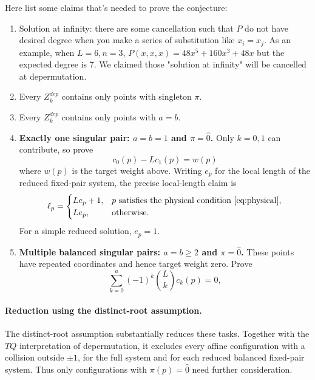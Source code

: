 \documentclass[11pt]{article}
\theoremstyle{definition}
\begin{document}
Here list some claims that's needed to prove the conjecture:
\begin{enumerate}
	\item Solution at infinity: there are some cancellation such that $P$ do not have desired degree when you make a series of substitution like $x_i=x_j$. As an example, when $L=6,n=3$, $P(x,x,x)=48x^5+160x^3+48x$ but the expected degree is $7$. We claimed those "solution at infinity" will be cancelled at depermutation.
	\item Every $Z^{dep}_{k}$ contains only points with singleton $\pi$. 
	\item Every $Z^{dep}_{k}$ contains only points with $a=b$.
	\item \textbf{Exactly one singular pair: $a=b=1$ and $\pi=\hat 0$.}
	Only $k=0,1$ can contribute, so prove
	\begin{equation}\label{eq:singular_weight}
	c_0(p)-Lc_1(p)=w(p)
	\end{equation}
	where $w(p)$ is the target weight above.
	Writing $e_p$ for the local length of the reduced fixed-pair
	system, the precise local-length claim is
	\begin{equation}\label{eq:single-pair-length-criterion}
	 \ell_p=
	 \begin{cases}
	 Le_p+1,&p\text{ satisfies the physical condition }\eqref{eq:physical},\\
	 Le_p,&\text{otherwise}.
	 \end{cases}
	\end{equation}
	For a simple reduced solution, $e_p=1$.

	\item \textbf{Multiple balanced singular pairs: $a=b\ge2$ and $\pi=\hat 0$.}
	These points have repeated coordinates and hence target weight zero.
	Prove
	\[
	\sum_{k=0}^{a}(-1)^k\binom Lk c_k(p)=0,
	\]

\end{enumerate}

\paragraph{Reduction using the distinct-root assumption.}
The distinct-root assumption substantially reduces these tasks.
Together with the $TQ$ interpretation of depermutation, it excludes
every affine configuration with a collision outside $\pm1$, for the
full system and for each reduced balanced fixed-pair system. Thus only
configurations with $\pi(p)=\hat0$ need further consideration.
\end{document}
